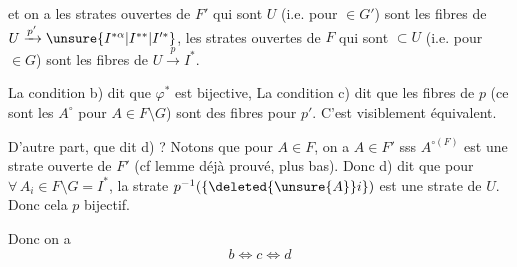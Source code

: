 
et on a
les  strates ouvertes de $F'$ qui sont  \inserted{$\subset$} $U$ (i.e. pour  $\in G'$) sont les fibres de $U\xrightarrow{p'}\unsure{I^{*\alpha}|I^{**}|I'^{*}}$, les strates ouvertes de $F$ qui sont $\subset U$ (i.e. pour $\in G$) sont les fibres de $U\xrightarrow{p}I^{*}$.

La condition b) dit que $\varphi^{*}$ est bijective,
La condition c) dit que les fibres de $p$ (ce sont les $A^\circ$ pour $A\in F\setminus G$) sont des fibres pour $p'$. C'est  visiblement équivalent.


D'autre part, que dit d) ? Notons  que pour $A\in F$, on a $A\in F'$ sss $A^{\circ(F)}$ est une strate ouverte de $F'$ (cf lemme déjà prouvé,  plus bas). Donc d) dit que pour $\forall\,A_i\in F\setminus G=I^{*}$,  la strate $p^{-1}(\{\deleted{\unsure{A}}i\})$ est une strate  de $U$. Donc cela  $p$ bijectif.

Donc on a
\[b\Longleftrightarrow c\Longleftrightarrow d\]


